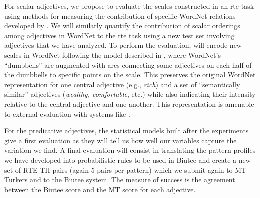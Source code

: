 \documentclass[10pt]{article}
\begin{document}
For scalar adjectives, we propose to evaluate the scales constructed in an {\sc rte} task using methods for measuring the contribution of specific WordNet relations developed by \cite{clark2008using,clark2008augmenting,clark2007role}. 
We will similarly quantify the contribution of scalar orderings among adjectives in WordNet to the {\sc rte} task using a new test set involving adjectives that we have analyzed. 
To perform the evaluation, will encode new scales in WordNet following the model described in 
\cite{sheinmanetal2013}, where WordNet's ``dumbbells'' are augmented with arcs connecting some  adjectives on each half of the dumbbells to specific 
points on the scale. This preserves the original WordNet representation for one central 
adjective (e.g., \emph{rich}) and a set of ``semantically similar'' adjectives (\emph{wealthy, comfortable}, etc.) while also indicating their intensity relative to the central adjective and one another.
This representation is amenable to external evaluation with systems like \cite{clark2007role}.

For the predicative adjectives, the statistical models built after the experiments give a first evaluation as they will tell us how well our variables capture the variation we find. A final evaluation will consist in translating the pattern profiles we have developed into probabilistic rules to be used in Biutee and create a new set of RTE TH pairs (again 5 pairs per pattern) which we submit again to MT Turkers and to the Biutee system. The measure of success is the agreement between the Biutee score and the MT score for each adjective.   


\end{document}

